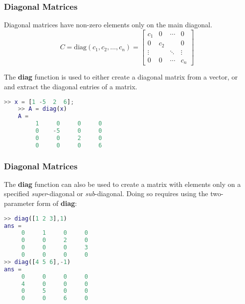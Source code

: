 \documentclass[10pt]{beamer}
\begin{document}
\begin{frame}[fragile]
\frametitle{Diagonal Matrices}

Diagonal matrices have non-zero elements only on
the main diagonal.
\begin{equation*}
    C = \text{diag}\left( c_1, c_2, \ldots, c_n \right)
      = \begin{bmatrix}  c_1   &  0  & \cdots & 0 \\
                          0    & c_2 &        & 0 \\
                        \vdots &     & \ddots & \vdots \\
                          0    &  0  & \cdots & c_n
        \end{bmatrix}
\end{equation*}

The \textbf{diag} function is used to either create a
diagonal matrix from a vector, or and extract the diagonal entries of a
matrix.
\begin{lstlisting}[language=matlab]
    >> x = [1 -5  2  6];
    >> A = diag(x)
    A =
         1     0     0     0
         0    -5     0     0
         0     0     2     0
         0     0     0     6
\end{lstlisting}

\end{frame}
\begin{frame}[fragile]
\frametitle{Diagonal Matrices}

The \textbf{diag} function can also be used to create a
matrix with elements only on a specified \emph{super}-diagonal
or \emph{sub}-diagonal.  Doing so requires using the
two-parameter form of \textbf{diag}:
\begin{lstlisting}[language=matlab]
>> diag([1 2 3],1)
ans =
     0     1     0     0
     0     0     2     0
     0     0     0     3
     0     0     0     0
>> diag([4 5 6],-1)
ans =
     0     0     0     0
     4     0     0     0
     0     5     0     0
     0     0     6     0

\end{lstlisting}


\end{frame}
\end{document}
